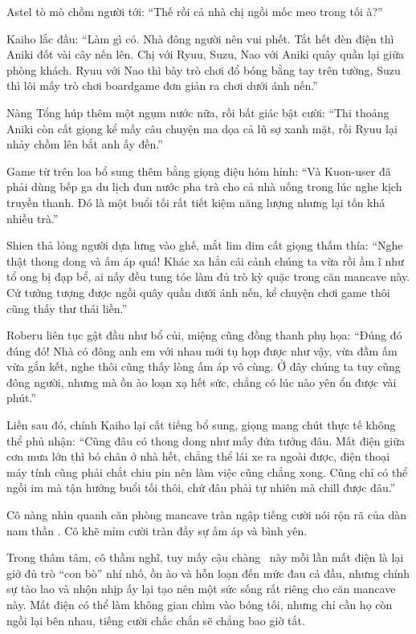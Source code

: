 \documentclass[../main.tex]{subfiles}
\begin{document}
Astel tò mò chồm người tới: ``Thế rồi cả nhà chị ngồi mốc meo trong tối à?''

Kaiho lắc đầu: ``Làm gì có. Nhà đông người nên vui phết. Tắt hết đèn điện thì Aniki đốt vài cây nến lên. Chị với Ryuu, Suzu, Nao với Aniki quây quần lại giữa phòng khách. Ryuu với Nao thì bày trò chơi đổ bóng bằng tay trên tường, Suzu thì lôi mấy trò chơi boardgame đơn giản ra chơi dưới ánh nến.''

Nàng Tổng húp thêm một ngụm nước nữa, rồi bất giác bật cười: ``Thi thoảng Aniki còn cất giọng kể mấy câu chuyện ma dọa cả lũ sợ xanh mặt, rồi Ryuu lại nhảy chồm lên bắt anh ấy đền.''

Game từ trên loa bổ sung thêm bằng giọng điệu hóm hỉnh: ``Và Kuon-user đã phải dùng bếp ga du lịch đun nước pha trà cho cả nhà uống trong lúc nghe kịch truyền thanh. Đó là một buổi tối rất tiết kiệm năng lượng nhưng lại tốn khá nhiều trà.''

Shien thả lỏng người dựa lưng vào ghế, mắt lim dim cất giọng thấm thía: ``Nghe thật thong dong và ấm áp quá! Khác xa hẳn cái cảnh chúng ta vừa rồi ầm ĩ như tổ ong bị đạp bể, ai nấy đều tung tóe làm đủ trò kỳ quặc trong căn mancave này. Cứ tưởng tượng được ngồi quây quần dưới ánh nến, kể chuyện chơi game thôi cũng thấy thư thái liền.''

Roberu liên tục gật đầu như bổ củi, miệng cũng đồng thanh phụ họa: ``Đúng đó đúng đó! Nhà có đông anh em với nhau mới tụ họp được như vậy, vừa đầm ấm vừa gắn kết, nghe thôi cũng thấy lòng ấm áp vô cùng. Ở đây chúng ta tuy cũng đông người, nhưng mà ồn ào loạn xạ hết sức, chẳng có lúc nào yên ổn được vài phút.''

Liền sau đó, chính Kaiho lại cất tiếng bổ sung, giọng mang chút thực tế không thể phủ nhận: ``Cũng đâu có thong dong như mấy đứa tưởng đâu. Mất điện giữa cơn mưa lớn thì bó chân ở nhà hết, chẳng thể lái xe ra ngoài được, điện thoại máy tính cũng phải chắt chiu pin nên làm việc cũng chẳng xong. Cũng chỉ có thể ngồi im mà tận hưởng buổi tối thôi, chứ đâu phải tự nhiên mà chill được đâu.''

Cô nàng nhìn quanh căn phòng mancave tràn ngập tiếng cười nói rộn rã của dàn nam thần \hls. Cô khẽ mỉm cười tràn đầy sự ấm áp và bình yên.

Trong thâm tâm, cô thầm nghĩ, tuy mấy cậu chàng \hls\ này mỗi lần mất điện là lại giở đủ trò ``con bò'' nhí nhố, ồn ào và hỗn loạn đến mức đau cả đầu, nhưng chính sự tào lao và nhộn nhịp ấy lại tạo nên một sức sống rất riêng cho căn mancave này. Mất điện có thể làm không gian chìm vào bóng tối, nhưng chỉ cần họ còn ngồi lại bên nhau, tiếng cười chắc chắn sẽ chẳng bao giờ tắt.
\end{document}
